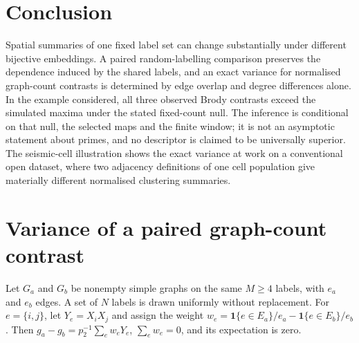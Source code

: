 \documentclass[final,1p,times,authoryear]{elsarticle}
\theoremstyle{definition}
\begin{document}
\section{Conclusion}

Spatial summaries of one fixed label set can change substantially under
different bijective embeddings. A paired random-labelling comparison preserves
the dependence induced by the shared labels, and an exact variance for
normalised graph-count contrasts is determined by edge overlap and degree
differences alone. In the example considered, all three observed Brody
contrasts exceed the simulated maxima under the stated fixed-count null. The
inference is conditional on that null, the selected maps and the finite
window; it is not an asymptotic statement about primes, and no descriptor is
claimed to be universally superior. The seismic-cell illustration shows the
exact variance at work on a conventional open dataset, where two adjacency
definitions of one cell population give materially different normalised
clustering summaries.

\clearpage
\appendix
\setcounter{table}{0}
\setcounter{figure}{0}
\section{Variance of a paired graph-count contrast}
\label{app:variance}

Let $G_a$ and $G_b$ be nonempty simple graphs on the same $M\ge4$ labels, with
$e_a$ and $e_b$ edges. A set of $N$ labels is drawn uniformly without
replacement. For $e=\{i,j\}$, let $Y_e=X_iX_j$ and assign the weight
$w_e=\mathbf{1}\{e\in E_a\}/e_a-\mathbf{1}\{e\in E_b\}/e_b$. Then
$g_a-g_b=p_2^{-1}\sum_e w_eY_e$, $\sum_e w_e=0$, and its expectation is zero.
\end{document}
